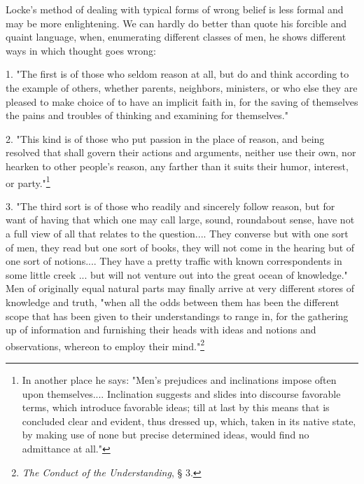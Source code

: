 \documentclass[showtrims,ustradepaper]{memoir}
\begin{document}

Locke's method of dealing with typical forms of wrong belief is less
formal and may be more enlightening. We can hardly do better than quote
his forcible and quaint language, when, enumerating different classes of
men, he shows different ways in which thought goes
wrong:


1. "The first is of those who seldom reason at all, but do and think
according to the example of others, whether parents, neighbors,
ministers, or who else they are pleased to make choice of to have an
implicit faith in, for the saving of themselves the pains and troubles
of thinking and examining for themselves."


2. "This kind is of those who put passion in the place of reason, and
being resolved that shall govern their actions and arguments, neither
use their own, nor hearken to other people's reason, any farther than it
suits their humor, interest, or
party."\footnote{In another place he says: "Men's prejudices and inclinations impose
often upon themselves.... Inclination suggests and slides into discourse
favorable terms, which introduce favorable ideas; till at last by this
means that is concluded clear and evident, thus dressed up, which, taken
in its native state, by making use of none but precise determined ideas,
would find no admittance at all."
}


3. "The third sort is of those who readily and sincerely follow reason,
but for want of having that which one may call large, sound, roundabout
sense, have not a full view of all that relates to the question.... They
converse but with one sort of men, they read but one sort of books, they
will not come in the hearing but of one sort of notions.... They have a
pretty traffic with known correspondents in some little creek ... but
will not venture out into the great ocean of knowledge." Men of
originally equal natural parts may finally arrive at very different
stores of knowledge and truth, "when all the odds between them has been
the different scope that has been given to their understandings to range
in, for the gathering up of information and furnishing their heads with
ideas and notions and observations, whereon to employ their
mind."\footnote{\emph{The Conduct of the Understanding}, § 3.}
\end{document}
